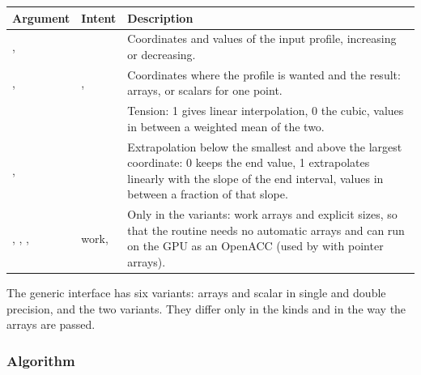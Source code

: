 \begin{longtable}{L{2.2cm} L{1.5cm} L{10.3cm}}
  \toprule
  \textbf{Argument} & \textbf{Intent} & \textbf{Description} \\
  \midrule
  \endhead
  \bottomrule
  \endfoot
  ,  &  &
    Coordinates and values of the input profile, increasing or
    decreasing. \\
  ,  & ,  &
    Coordinates where the profile is wanted and the result: arrays, or
    scalars for one point. \\
   &  &
    Tension: 1 gives linear interpolation, 0 the cubic, values in between
    a weighted mean of the two. \\
  ,  &  &
    Extrapolation below the smallest and above the largest coordinate:
    0 keeps the end value, 1 extrapolates linearly with the slope of the
    end interval, values in between a fraction of that slope. \\
  , , ,  & work,  &
    Only in the  variants: work arrays and explicit sizes, so
    that the routine needs no automatic arrays and can run on the GPU as an
    OpenACC  (used by  with pointer
    arrays). \\
\end{longtable}

The generic interface has six variants: arrays and scalar  in
single and double precision, and the two  variants. They
differ only in the kinds and in the way the arrays are passed.

\subsubsection{Algorithm}

